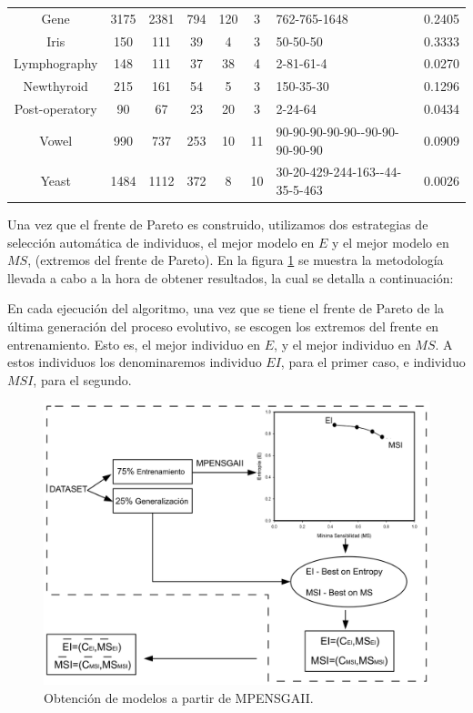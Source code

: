\begin{table}[htb!]
\begin{tabular}{c c c c c c p{2.5cm} c}
\rowcolor[rgb]{0.86,0.94,1}Gene & 3175 & 2381 & 794 & 120 & 3 & 762-765-1648 & 0.2405 \\
\rowcolor[rgb]{0.86,0.94,1}Iris & 150 & 111 & 39 & 4 & 3 & 50-50-50 & 0.3333 \\
\rowcolor[rgb]{0.86,0.94,1}Lymphography & 148 & 111 & 37 & 38 & 4 & 2-81-61-4 & 0.0270 \\
\rowcolor[rgb]{0.86,0.94,1}Newthyroid & 215 & 161 & 54 & 5 & 3 & 150-35-30 & 0.1296 \\
\rowcolor[rgb]{0.86,0.94,1}Post-operatory & 90 & 67 & 23 & 20 & 3 & 2-24-64 & 0.0434 \\
\rowcolor[rgb]{0.86,0.94,1}Vowel & 990 & 737 & 253 & 10 & 11 & 90-90-90-90-90-\newline
90-90-90-90-90-90 & 0.0909 \\
\rowcolor[rgb]{0.86,0.94,1}Yeast & 1484 & 1112 & 372 & 8 & 10 & 30-20-429-244-163-\newline
51-44-35-5-463 & 0.0026 \\ \hline
\end{tabular}
\end{table}

Una vez que el frente de Pareto es construido, utilizamos dos estrategias de selección
automática de individuos, el mejor modelo en $E$ y el mejor modelo en $MS$, (extremos del frente de
Pareto). En la figura
\ref{obtencionResultados} se muestra la
metodología llevada a cabo a la hora de obtener resultados, la cual se detalla a
continuación:

En cada ejecución del algoritmo, una vez que se tiene el frente de Pareto de la
última generación del proceso evolutivo, se escogen los extremos del frente en
entrenamiento. Esto es, el mejor individuo en $E$, y el mejor individuo en
$MS$. A estos individuos los denominaremos individuo $EI$, para el
primer caso, e individuo $MSI$, para el segundo.

\begin{figure}[htb!]
\centering
\includegraphics[keepaspectratio,width=13cm]{figuras/obtencionResultados.jpg}
\caption{Obtención de modelos a partir de MPENSGAII.}
\label{obtencionResultados}
\end{figure}

